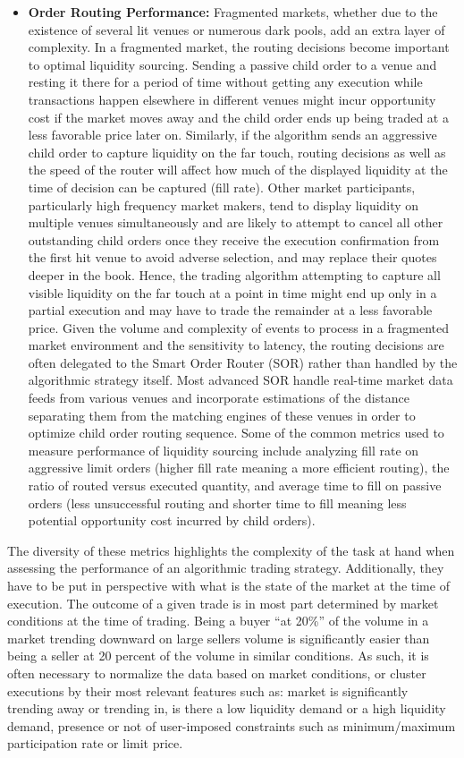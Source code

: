 \begin{itemize}
\item \textbf{Order Routing Performance:} Fragmented markets, whether due to the existence of several lit venues or numerous dark pools, add an extra layer of complexity. In a fragmented market, the routing decisions become important to optimal liquidity sourcing. Sending a passive child order to a venue and resting it there for a period of time without getting any execution while transactions happen elsewhere in different venues might incur opportunity cost if the market moves away and the child order ends up being traded at a less favorable price later on. Similarly, if the algorithm sends an aggressive child order to capture liquidity on the far touch, routing decisions as well as the speed of the router will affect how much of the displayed liquidity at the time of decision can be captured (fill rate). Other market participants, particularly high frequency market makers, tend to display liquidity on multiple venues simultaneously and are likely to attempt to cancel all other outstanding child orders once they receive the execution confirmation from the first hit venue to avoid adverse selection, and may replace their quotes deeper in the book. Hence, the trading algorithm attempting to capture all visible liquidity on the far touch at a point in time might end up only in a partial execution and may have to trade the remainder at a less favorable price. Given the volume and complexity of events to process in a fragmented market environment and the sensitivity to latency, the routing decisions are often delegated to the Smart Order Router (SOR) rather than handled by the algorithmic strategy itself. Most advanced SOR handle real-time market data feeds from various venues and incorporate estimations of the distance separating them from the matching engines of these venues in order to optimize child order routing sequence. Some of the common metrics used to measure performance of liquidity sourcing include analyzing fill rate on aggressive limit orders (higher fill rate meaning a more efficient routing), the ratio of routed versus executed quantity, and average time to fill on passive orders (less unsuccessful routing and shorter time to fill meaning less potential opportunity cost incurred by child orders).
\end{itemize}

The diversity of these metrics highlights the complexity of the task at hand when assessing the performance of an algorithmic trading strategy. Additionally, they have to be put in perspective with what is the state of the market at the time of execution. The outcome of a given trade is in most part determined by market conditions at the time of trading. Being a buyer ``at 20\%'' of the volume in a market trending downward on large sellers volume is significantly easier than being a seller at 20 percent of the volume in similar conditions. As such, it is often necessary to normalize the data based on market conditions, or cluster executions by their most relevant features such as: market is significantly trending away or trending in, is there a low liquidity demand or a high liquidity demand, presence or not of user-imposed constraints such as minimum/maximum participation rate or limit price. 


